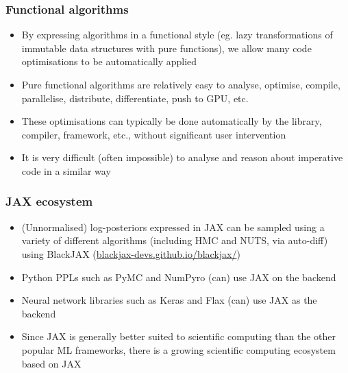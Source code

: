 \documentclass[mathserif,handout]{beamer}
\begin{document}
\begin{frame}
  \frametitle{Functional algorithms}
  \begin{itemize}
  \item By expressing algorithms in a functional style (eg. lazy transformations of immutable data structures with pure functions), we allow many code optimisations to be automatically applied
  \item \alert{Pure functional} algorithms are relatively easy to \alert{analyse}, \alert{optimise}, \alert{compile}, \alert{parallelise}, \alert{distribute}, \alert{differentiate}, push to GPU, etc.
  \item These optimisations can typically be done \alert{automatically} by the library, compiler, framework, etc., without significant user intervention
    \item It is very difficult (often impossible) to analyse and reason about imperative code in a similar way
  \end{itemize}
\end{frame}


\begin{frame}
  \frametitle{JAX ecosystem}
  \begin{itemize}
  \item (Unnormalised) log-posteriors expressed in JAX can be sampled using a variety of different algorithms (including HMC and NUTS, via auto-diff) using \alert{BlackJAX} (\url{blackjax-devs.github.io/blackjax/})
  \item Python PPLs such as \alert{PyMC} and \alert{NumPyro} (can) use JAX on the backend
  \item Neural network libraries such as \alert{Keras} and \alert{Flax} (can) use JAX as the backend
    \item Since JAX is generally better suited to scientific computing than the other popular ML frameworks, there is a growing scientific computing ecosystem based on JAX
  \end{itemize}
\end{frame}
\end{document}
